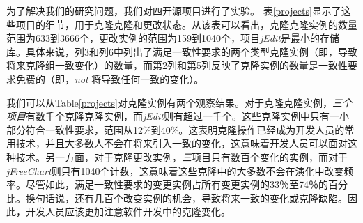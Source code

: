 
为了解决我们的研究问题，我们对{四}开源项目进行了实验。
表\ref{projects}显示了这些项目的细节，用于克隆克隆和更改状态。从该表可以看出，克隆克隆实例的数量范围为633到3666个，更改实例的范围为159到1040个，项目{\em jEdit}是最小的存储库。具体来说，列3和列6中列出了满足一致性要求的两个类型克隆实例（即，导致将来克隆组一致变化）的数量，而第2列和第5列反映了克隆实例的数量是一致性要求免费的（即，{\em not \/}将导致任何一致的变化）。

我们可以从Table\ref{projects}对克隆实例有两个观察结果。对于克隆克隆实例，{\em  三个项目}有数千个克隆克隆实例，而{\em jEdit}则有超过一千个。这些克隆实例中只有一小部分符合一致性要求，范围从12\%到40\%。这表明克隆操作已经成为开发人员的常用技术，并且大多数人不会在将来引入一致的变化，这意味着开发人员可以面对这种技术。另一方面，对于克隆更改实例，{\em  三}项目只有数百个变化的实例，而对于{\em  jFreeChart}则只有1040个计数，这意味着这些克隆中的大多数不会在演化中改变频率。尽管如此，满足一致性要求的变更实例占所有变更实例的33％至74％的百分比。换句话说，还有几百个改变实例的机会，导致将来一致的变化或克隆缺陷。因此，开发人员应该更加注意软件开发中的克隆变化。

